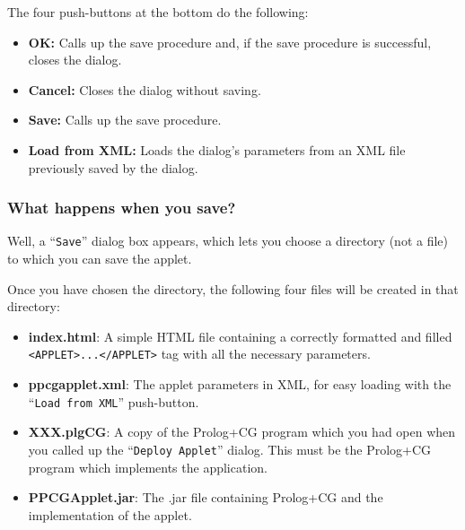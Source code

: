 \documentclass{book}
\begin{document}
The four push-buttons at the bottom do the following:

\begin{itemize}

  \item {\bf OK:} Calls up the save procedure and, if the
  save procedure is successful, closes the dialog.

  \item {\bf Cancel:} Closes the dialog without saving.

  \item {\bf Save:} Calls up the save procedure.

  \item {\bf Load from XML:} Loads the dialog's parameters
  from an XML file previously saved by the dialog.

\end{itemize}

\subsubsection{What happens when you save?}

Well, a ``\texttt{Save}'' dialog box appears, which lets you choose a
directory (not a file) to which you can save the applet.

Once you have chosen the directory, the following four files will
be created in that directory:

\begin{itemize}

  \item {\bf index.html}: A simple HTML file containing a correctly
  formatted and filled \texttt{<APPLET>...</APPLET>} tag with all the
  necessary parameters.

  \item {\bf ppcgapplet.xml}: The applet parameters in XML,
  for easy loading with the ``\texttt{Load from XML}'' push-button.

  \item {\bf XXX.plgCG}: A copy of the Prolog+CG program
  which you had open when you called up the ``\texttt{Deploy Applet}'' dialog.
  This must be the Prolog+CG program which implements the application.

  \item {\bf PPCGApplet.jar}: The .jar file containing Prolog+CG and the implementation of the applet.

\end{itemize}
\end{document}
